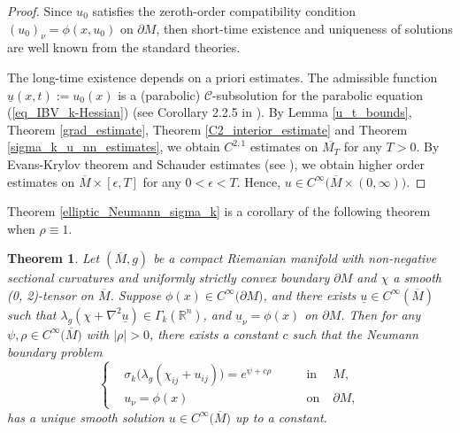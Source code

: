 \documentclass[12pt]{amsart}
\newtheorem{theorem}{Theorem}[section]
\theoremstyle{definition}
\theoremstyle{remark}
\numberwithin{equation}{section}
\begin{document}
\begin{proof}
	
	Since $u_0$ satisfies the zeroth-order compatibility condition $(u_0)_\nu = \phi(x, u_0)$ on $\partial M$, then short-time existence and uniqueness of solutions are well known from the standard theories.
	
	The long-time existence depends on a priori estimates. 
	The admissible function $\underline{u}(x, t) := u_0(x)$ is a (parabolic) $\mathcal{C}$-subsolution for the parabolic equation (\ref{eq_IBV_k-Hessian}) (see Corollary 2.2.5 in \cite{GuoThesis19}). 
	By Lemma \ref{u_t_bounds}, Theorem \ref{grad_estimate}, Theorem \ref{C2_interior_estimate} and Theorem \ref{sigma_k_u_nn_estimates}, we obtain $C^{2, 1}$ estimates on $\overline{M_T}$ for any $T > 0$. By Evans-Krylov theorem \cite{Evans82} \cite{Kry82} and Schauder estimates (see \cite{LSU68}), we obtain higher order estimates on $\overline{M} \times [\epsilon, T]$ for any $0 < \epsilon < T$. Hence, $u \in C^{\infty}\big( \overline{M} \times (0, \infty) \big)$.
\end{proof}


Theorem \ref{elliptic_Neumann_sigma_k} is a corollary of the following theorem when $\rho \equiv 1$.


\begin{theorem}\label{elliptic_Neumann_sigma_k_general}
	Let $(\overline{M}, g)$ be a compact Riemanian manifold with non-negative sectional curvatures and uniformly strictly convex boundary $\partial M$ and $\chi$ a smooth (0, 2)-tensor on $\overline{M}$.
	Suppose $\phi(x) \in C^{\infty} \big(\partial M\big)$, and there exists $\underline{u} \in C^{\infty}(\overline{M})$ such that $\lambda_g(\chi + \nabla^2 \underline{u}) \in \Gamma_k(\mathbb{R}^n)$, and $\underline{u}_\nu = \phi(x)$ on $\partial M$.
	Then for any $\psi, \rho \in C^{\infty}\big( \overline{M} \big)$ with $|\rho| > 0$, there exists a constant $c$ such that the Neumann boundary problem
	\begin{equation}\label{univ_conv_sigma_k_eq}
	\left\{
	\begin{aligned}
	&\sigma_k\big(\lambda_g(\chi_{ij} + u_{ij})\big) = e^{\psi + c\rho} \qquad &\text{in}&\; M, \\ 
	&u_\nu = \phi(x) \qquad &\text{on}& \; \partial M,   
	\end{aligned}
	\right.
	\end{equation}
	has a unique smooth solution $u \in C^{\infty} \big(\overline{M} \big)$ up to a constant.
\end{theorem}
\end{document}
